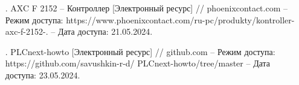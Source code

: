 {\begin{itemize}[leftmargin=2.15cm, labelwidth=0.65cm, labelsep=0.0cm]
    \item[\theimagecntr.]	AXC F 2152 {--} Контроллер [Электронный ресурс] // phoenixcontact.com – Режим доступа: https://www.phoenixcontact.com/ru-pc/produkty/kontroller-axc-f-2152-. {--} Дата доступа: 21.05.2024. \addtocounter{imagecntr}{1}
    
    \item[\theimagecntr.] PLCnext-howto [Электронный ресурс] // github.com {--} Режим доступа: https://git\newline hub.com/savushkin-r-d/ PLCnext-howto/tree/master {--} Дата доступа: 23.05.2024. \addtocounter{imagecntr}{1}
    
     
    
    

\end{itemize}

}
